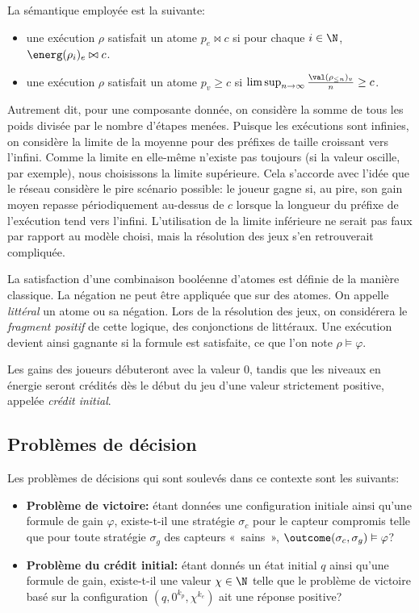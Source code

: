 La sémantique employée est la suivante:
\begin{itemize}
    \item une exécution $\rho$ satisfait un atome $p_e \bowtie c$ si pour chaque $i \in \N$, $\energ(\rho_i)_e \bowtie c$.
    \item une exécution $\rho$ satisfait un atome $p_v \geq c$ si $\limsup_{n \rightarrow \infty} \frac{\val(\rho_{\leq n})_v}{n} \geq c$.
\end{itemize}
Autrement dit, pour une composante donnée, on considère la somme de tous les poids divisée par le nombre d'étapes menées.
Puisque les exécutions sont infinies, on considère la limite de la moyenne pour des préfixes de taille croissant vers l'infini.
Comme la limite en elle-même n'existe pas toujours (si la valeur oscille, par exemple), nous choisissons la limite supérieure.
Cela s'accorde avec l'idée que le réseau considère le pire scénario possible: le joueur gagne si, au pire, son gain moyen repasse périodiquement au-dessus de $c$ lorsque la longueur du préfixe de l'exécution tend vers l'infini.
L'utilisation de la limite inférieure ne serait pas faux par rapport au modèle choisi, mais la résolution des jeux s'en retrouverait compliquée.

La satisfaction d'une combinaison booléenne d'atomes est définie de la manière classique.
La négation ne peut être appliquée que sur des atomes.
On appelle \emph{littéral} un atome ou sa négation.
Lors de la résolution des jeux, on considérera le \emph{fragment positif} de cette logique, \cad des conjonctions de littéraux.
Une exécution devient ainsi gagnante si la formule est satisfaite, ce que l'on note $\rho\vDash\varphi$.

Les gains des joueurs débuteront avec la valeur $0$, tandis que les niveaux en énergie seront crédités dès le début du jeu d'une valeur strictement positive, appelée \emph{crédit initial}.

\subsection{Problèmes de décision}

Les problèmes de décisions qui sont soulevés dans ce contexte sont les suivants:

\begin{itemize}
    \item \textbf{Problème de victoire:} étant données une configuration initiale ainsi qu'une formule de gain $\varphi$, existe-t-il une stratégie $\sigma_c$ pour le capteur compromis telle que pour toute stratégie $\sigma_g$ des capteurs « sains », $\outcome(\sigma_c,\sigma_g) \vDash \varphi$?
    \item \textbf{Problème du crédit initial:} étant donnés un état initial $q$ ainsi qu'une formule de gain, existe-t-il une valeur $\chi \in \N$ telle que le problème de victoire basé sur la configuration $(q,0^{k_p},\chi^{k_e})$ ait une réponse positive?
\end{itemize}
